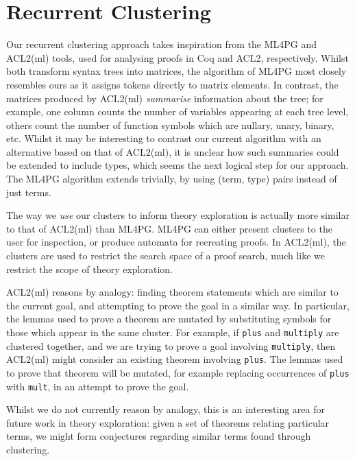 \section{Recurrent Clustering}

Our recurrent clustering approach takes inspiration from the ML4PG
\cite{journals/corr/abs-1212-3618} and ACL2(ml) \cite{heras2013proof} tools,
used for analysing proofs in Coq and ACL2, respectively. Whilst both transform
syntax trees into matrices, the algorithm of ML4PG most closely resembles ours
as it assigns tokens directly to matrix elements. In contrast, the matrices
produced by ACL2(ml) \emph{summarise} information about the tree; for example,
one column counts the number of variables appearing at each tree level, others
count the number of function symbols which are nullary, unary, binary,
etc. Whilst it may be interesting to contrast our current algorithm with an
alternative based on that of ACL2(ml), it is unclear how such summaries could be
extended to include types, which seems the next logical step for our
approach. The ML4PG algorithm extends trivially, by using (term, type) pairs
instead of just terms.

The way we \emph{use} our clusters to inform theory exploration is actually more
similar to that of ACL2(ml) than ML4PG. ML4PG can either present clusters to the
user for inspection, or produce automata for recreating proofs. In ACL2(ml), the
clusters are used to restrict the search space of a proof search, much like we
restrict the scope of theory exploration.

ACL2(ml) reasons by analogy: finding theorem statements which are similar to the
current goal, and attempting to prove the goal in a similar way. In particular,
the lemmas used to prove a theorem are mutated by substituting symbols for those
which appear in the same cluster. For example, if \texttt{plus} and
\texttt{multiply} are clustered together, and we are trying to prove a goal
involving \texttt{multiply}, then ACL2(ml) might consider an existing theorem
involving \texttt{plus}. The lemmas used to prove that theorem will be mutated,
for example replacing occurrences of \texttt{plus} with \texttt{mult}, in an
attempt to prove the goal.

Whilst we do not currently reason by analogy, this is an interesting area for
future work in theory exploration: given a set of theorems relating particular
terms, we might form conjectures regarding similar terms found through
clustering.

\iffalse
We could expand this a bit, e.g. talking about how we both use Weka, etc.
\fi
